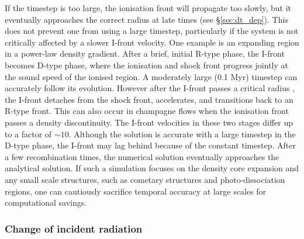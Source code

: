 \documentclass[useAMS,usenatbib]{mn2e}
\begin{document}
If the timestep is too large, the ionisation front will propagate too
slowly, but it eventually approaches the correct radius at late times
(see \S\ref{sec:dt_dep}).  This does not prevent one from using a
large timestep, particularly if the system is not critically affected
by a slower I-front velocity.  One example is an expanding \hii
region in a power-law density gradient.  After a brief, initial R-type
phase, the I-front becomes D-type phase, where the ionisation and
shock front progress jointly at the sound speed of the ionised region.
A moderately large (0.1 Myr) timestep can accurately follow its
evolution.  However after the I-front passes a critical radius
\citep{Franco90}, the I-front detaches from the shock front,
accelerates, and transitions back to an R-type front.  This can also
occur in champagne flows when the ionisation front passes a density
discontinuity.  The I-front velocities in these two stages differ up
to a factor of $\sim10$.  Although the solution is accurate with a
large timestep in the D-type phase, the I-front may lag behind because
of the constant timestep.  After a few recombination times, the
numerical solution eventually approaches the analytical solution.  If
such a simulation focuses on the density core expansion and any small
scale structures, such as cometary structures and photo-dissociation
regions, one can cautiously sacrifice temporal accuracy at large
scales for computational savings.

\subsubsection{Change of incident radiation}
\label{sec:dt_tau}
\end{document}
